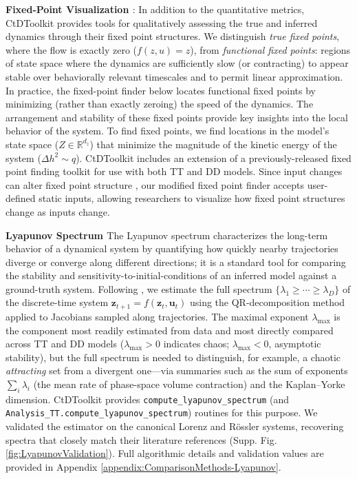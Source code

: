 \documentclass{article}
\begin{document}
\vspace{-0.2cm}
\textbf{Fixed-Point Visualization \label{FPCalc}}:
In addition to the quantitative metrics, CtDToolkit provides tools for qualitatively assessing the true and inferred dynamics through their fixed point structures. We distinguish \textit{true fixed points}, where the flow is exactly zero ($f(z,u) = z$), from \textit{functional fixed points}: regions of state space where the dynamics are sufficiently slow (or contracting) to appear stable over behaviorally relevant timescales and to permit linear approximation. In practice, the fixed-point finder below locates functional fixed points by minimizing (rather than exactly zeroing) the speed of the dynamics. The arrangement and stability of these fixed points provide key insights into the local behavior of the system. To find fixed points, we find locations in the model’s state space ($Z \in \mathbb{R}^{d_z}$) that minimize the magnitude of the kinetic energy of the system (\( \Delta h^2 \sim q \)). CtDToolkit includes an extension of a previously-released fixed point finding toolkit \cite{golub_fixedpointfinder_2018} for use with both TT and DD models. Since input changes can alter fixed point structure \cite{driscoll_flexible_2022, strogatz_nonlinear_2019}, our modified fixed point finder accepts user-defined static inputs, allowing researchers to visualize how fixed point structures change as inputs change.

\textbf{Lyapunov Spectrum \label{LyapCalc}}
The Lyapunov spectrum characterizes the long-term behavior of a dynamical system by quantifying how quickly nearby trajectories diverge or converge along different directions; it is a standard tool for comparing the stability and sensitivity-to-initial-conditions of an inferred model against a ground-truth system. Following \cite{eisen2025characterizingcontrolinteractingsubsystems}, we estimate the full spectrum $\{\lambda_1 \geq \cdots \geq \lambda_D\}$ of the discrete-time system $\mathbf{z}_{t+1} = f(\mathbf{z}_t, \mathbf{u}_t)$ using the QR-decomposition method applied to Jacobians sampled along trajectories. The maximal exponent $\lambda_{\max}$ is the component most readily estimated from data and most directly compared across TT and DD models ($\lambda_{\max} > 0$ indicates chaos; $\lambda_{\max} < 0$, asymptotic stability), but the full spectrum is needed to distinguish, for example, a chaotic \emph{attracting} set from a divergent one---via summaries such as the sum of exponents $\sum_i \lambda_i$ (the mean rate of phase-space volume contraction) and the Kaplan--Yorke dimension. CtDToolkit provides \texttt{compute\_lyapunov\_spectrum} (and \texttt{Analysis\_TT.compute\_lyapunov\_spectrum}) routines for this purpose. We validated the estimator on the canonical Lorenz and R\"ossler systems, recovering spectra that closely match their literature references (Supp. Fig. \ref{fig:LyapunovValidation}). Full algorithmic details and validation values are provided in Appendix \ref{appendix:ComparisonMethods-Lyapunov}.
\end{document}
